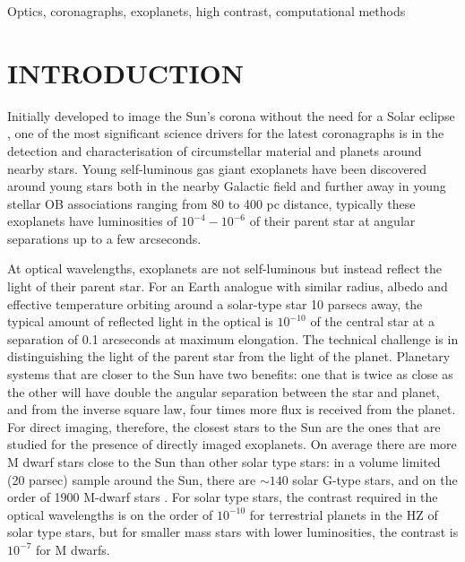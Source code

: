 \documentclass[letterpaper]{ar-1col}
\newcommand{\acc}[1]{\entry{\acs{#1}}{\acl{#1}}}
\begin{document}
\begin{keywords}
 Optics, coronagraphs, exoplanets, high contrast, computational methods
\end{keywords}
\maketitle

\tableofcontents

\section{INTRODUCTION}
\label{sec:intro}



Initially developed to image the Sun's corona without the need for a Solar eclipse \citep{Lyot33}, one of the most significant science drivers for the latest coronagraphs is in the detection and characterisation of circumstellar material and planets around nearby stars.
%
Young self-luminous gas giant exoplanets have been discovered around young stars \citep[see ][ for a review of these detections]{Zurlo24} both in the nearby Galactic field and further away in young stellar OB associations ranging from 80 to 400 pc distance, typically these exoplanets have luminosities of $10^{-4}-10^{-6}$ of their parent star at angular separations up to a few arcseconds. 


At optical wavelengths, exoplanets are not self-luminous but instead reflect the light of their parent star.
%
For an Earth analogue with similar radius, albedo and effective temperature orbiting around a solar-type star 10 parsecs away, the typical amount of reflected light in the optical is $10^{-10}$ of the central star at a separation of 0.1 arcseconds at maximum elongation.
%
The technical challenge is in distinguishing the light of the parent star from the light of the planet.
%
Planetary systems that are closer to the Sun have two benefits: one that is twice as close as the other will have double the angular separation between the star and planet, and from the inverse square law, four times more flux is received from the planet.
%
For direct imaging, therefore, the closest stars to the Sun are the ones that are studied for the presence of directly imaged exoplanets.
%
On average there are more M dwarf stars close to the Sun than other solar type stars: in a volume limited (20 parsec) sample around the Sun, there are $\sim 140$ solar G-type stars, and on the order of 1900 M-dwarf stars \citep{Kirkpatrick24}.
%
For solar type stars, the contrast required in the optical wavelengths is on the order of $10^{-10}$ for terrestrial planets in the HZ of solar type stars, but for smaller mass stars with lower luminosities, the contrast is $10^{-7}$ for M dwarfs.
\end{document}
